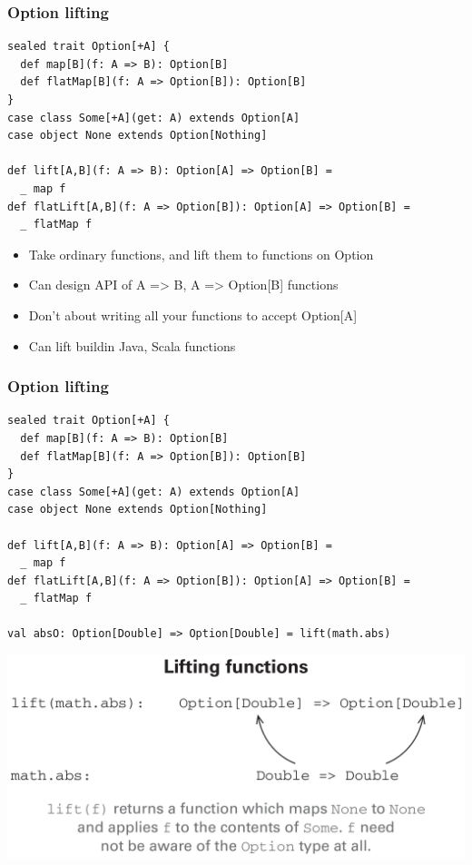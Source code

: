 \documentclass{beamer}
\begin{document}
\begin{frame}[fragile,t]
  \frametitle{Option lifting}
\begin{lstlisting}
sealed trait Option[+A] {
  def map[B](f: A => B): Option[B]
  def flatMap[B](f: A => Option[B]): Option[B]
}
case class Some[+A](get: A) extends Option[A]
case object None extends Option[Nothing]

def lift[A,B](f: A => B): Option[A] => Option[B] =
  _ map f
def flatLift[A,B](f: A => Option[B]): Option[A] => Option[B] =
  _ flatMap f
\end{lstlisting}
\begin{itemize}
  \item Take ordinary functions, and lift them to functions on {\ttfamily Option}
  \item Can design API of {\ttfamily A => B}, {\ttfamily A => Option[B]} functions
  \item Don't about writing all your functions to accept {\ttfamily Option[A]}
  \item Can lift buildin Java, Scala functions
\end{itemize}
\end{frame}

\begin{frame}[fragile,t]
  \frametitle{Option lifting}
\begin{lstlisting}
sealed trait Option[+A] {
  def map[B](f: A => B): Option[B]
  def flatMap[B](f: A => Option[B]): Option[B]
}
case class Some[+A](get: A) extends Option[A]
case object None extends Option[Nothing]

def lift[A,B](f: A => B): Option[A] => Option[B] =
  _ map f
def flatLift[A,B](f: A => Option[B]): Option[A] => Option[B] =
  _ flatMap f

val absO: Option[Double] => Option[Double] = lift(math.abs)
\end{lstlisting}
\begin{center}
  \includegraphics[scale=.13]{lift.png}
\end{center}
\end{frame}
\end{document}
